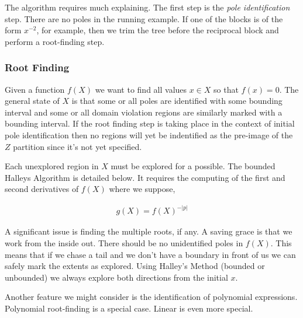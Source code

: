 The algorithm requires much explaining. The first step is the \emph{pole identification} step. There are no poles in the running example. If one of the blocks is of the form $x^{-2}$, for example, then we trim the tree before the reciprocal block and perform a root-finding step.

\subsubsection{Root Finding}

Given a function $f(X)$ we want to find all values $x \in X$ so that $f(x) = 0$. The general state of $X$ is that some or all poles are identified with some bounding interval and some or all domain violation regions are similarly marked with a bounding interval. If the root finding step is taking place in the context of initial pole identification then no regions will yet be indentified as the pre-image of the $Z$ partition since it's not yet specified.

Each unexplored region in $X$ must be explored for a possible. The bounded Halleys Algorithm is detailed below. It requires the computing of the first and second derivatives of $f(X)$ where we suppose,

\begin{align*}
g(X) = f(X)^{-|p|}
\end{align*}

A significant issue is finding the multiple roots, if any. A saving grace is that we work from the inside out. There should be no unidentified poles in $f(X)$. This means that if we chase a tail and we don't have a boundary in front of us we can safely mark the extents as explored. Using Halley's Method (bounded or unbounded) we always explore both directions from the initial $x$.

Another feature we might consider is the identification of polynomial expressions. Polynomial root-finding is a special case. Linear is even more special. 

